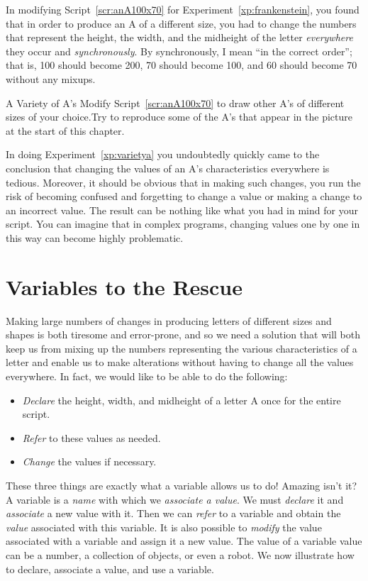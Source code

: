 \documentclass[a4paper,10pt,twoside]{book}
\begin{document}
In modifying Script~\ref{scr:anA100x70} for Experiment~\ref{xp:frankenstein}, you found that in order to produce an A of a different size, you had to change the numbers that represent the height, the width, and the 
midheight of the letter \emph{everywhere} they occur and \emph{synchronously}. By synchronously, I mean 
“in the correct order”; that is, 100 should become 200, 70 should become 100, and 60 should 
become 70 without any mixups. 


\begin{exonofigtitle}{A Variety of A’s}\label{xp:varietya}
Modify Script~\ref{scr:anA100x70} to draw other A’s of different sizes of your choice.Try to reproduce some of the A’s that appear in the picture at the start of this chapter. 
\end{exonofigtitle}

In doing Experiment~\ref{xp:varietya} you undoubtedly quickly came to the conclusion that changing 
the values of an A’s characteristics everywhere is tedious. Moreover, it should be obvious that 
in making such changes, you run the risk of becoming confused and forgetting to change a 
value or making a change to an incorrect value. The result can be nothing like what you had in 
mind for your script. You can imagine that in complex programs, changing values one by one 
in this way can become highly problematic. 


\section{Variables to the Rescue}

Making large numbers of changes in producing letters of different sizes and shapes is both 
tiresome and error-prone, and so we need a solution that will both keep us from mixing up the 
numbers representing the various characteristics of a letter and enable us to make alterations 
without having to change all the values everywhere. In fact, we would like to be able to do the 
following: 

\begin{itemize}
	\item \emph{Declare} the height, width, and midheight of a letter A once for the entire script. 
	\item \emph{Refer} to these values as needed.   
	\item \emph{Change} the values if necessary.
\end{itemize}


These three things are exactly what a variable allows us to do! Amazing isn’t it? A variable 
is a \emph{name} with which we \emph{associate a value}. We must \emph{declare} it and \emph{associate} a new value with it. Then we can \emph{refer} to a variable and obtain the \emph{value} associated with this variable. It is also possible to \emph{modify} the value associated with a variable and assign it a new value. The value of a variable value can be a number, a collection of objects, or even a robot. We now illustrate 
how to declare, associate a value, and use a variable.
\end{document}

